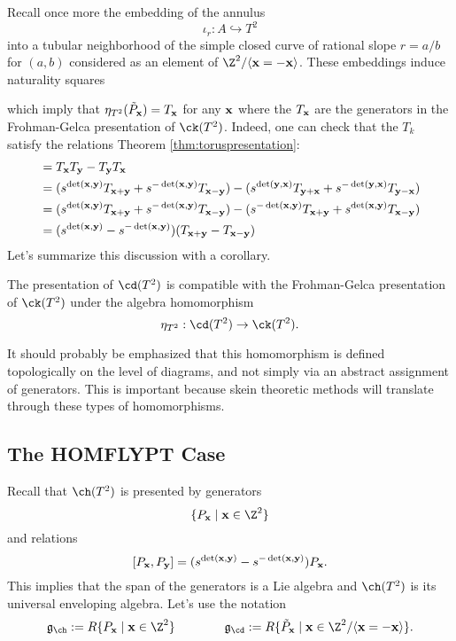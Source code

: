 Recall once more the embedding of the annulus
\[
\iota_r: A \hookrightarrow T^2
\]
into a tubular neighborhood of the simple closed curve of rational slope $r=a/b$ for $(a, b)$ considered as an element of $\Z^2 / \langle \xx = - \xx \rangle$. These embeddings induce naturality squares
\begin{center}
\end{center}
which imply that $\eta_{T^2}(\tilde{P}_{\mathbf{x}}) = T_{\mathbf{x}}$ for any ${\mathbf{x}}$ where the $T_{\mathbf{x}}$ are the generators in the Frohman-Gelca presentation of $\ck(T^2)$. Indeed, one can check that the $T_k$ satisfy the relations Theorem \ref{thm:toruspresentation}:
\begin{align*}
[T_\xx, T_\yy] &= T_\xx T_\yy - T_\yy T_\xx \\
&= (s^{\det(\xx, \yy)} T_{\xx + \yy} + s^{-\det(\xx, \yy)} T_{\xx - \yy}) - (s^{\det(\yy, \xx)} T_{\yy + \xx} + s^{-\det(\yy, \xx)} T_{\yy - \xx}) \\
&= (s^{\det(\xx, \yy)} T_{\xx + \yy} + s^{-\det(\xx, \yy)} T_{\xx - \yy}) - (s^{-\det(\xx, \yy)} T_{\xx + \yy} + s^{\det(\xx, \yy)} T_{\xx - \yy}) \\
&= (s^{\det(\xx, \yy)} - s^{-\det(\xx, \yy)}) (T_{\xx + \yy} - T_{\xx - \yy})
\end{align*}
Let's summarize this discussion with a corollary.
\begin{corollary} \label{cor:frohmangelcacompatibility}
The presentation of $\cd(T^2)$ is compatible with the Frohman-Gelca presentation of $\ck(T^2)$ under the algebra homomorphism
\[
\eta_{T^2}: \cd(T^2) \to \ck(T^2).
\]
\end{corollary}

It should probably be emphasized that this homomorphism is defined topologically on the level of diagrams, and not simply via an abstract assignment of generators. This is important because skein theoretic methods will translate through these types of homomorphisms. 


\subsection{The HOMFLYPT Case}

Recall that $\ch(T^2)$ is presented by generators 
\[
\{ P_\xx \mid \xx \in \Z^2 \}
\]
and relations
\[
[P_{\mathbf{x}}, P_{\mathbf{y}}] = (s^{\det({\mathbf{x}}, {\mathbf{y}})} - s^{-\det({\mathbf{x}}, {\mathbf{y}})}) P_{\mathbf{x}}.
\]
This implies that the span of the generators is a Lie algebra and $\ch(T^2)$ is its universal enveloping algebra. Let's use the notation 
\[
\mathfrak{g}_\ch := R\{ P_\xx \mid \xx \in \Z^2 \} \qquad \qquad \mathfrak{g}_\cd := R\{ \tilde{P}_\xx \mid \xx \in \Z^2 / \langle \xx = -\xx \rangle \}.
\]

